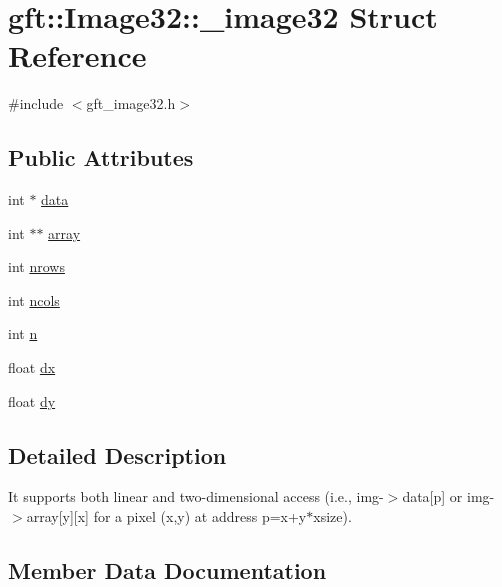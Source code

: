 \hypertarget{structgft_1_1Image32_1_1__image32}{}\section{gft\+:\+:Image32\+:\+:\+\_\+image32 Struct Reference}
\label{structgft_1_1Image32_1_1__image32}


{\ttfamily \#include $<$gft\+\_\+image32.\+h$>$}

\subsection*{Public Attributes}
\begin{DoxyCompactItemize}
\item 
int $\ast$ \hyperlink{structgft_1_1Image32_1_1__image32_ab054124c321db9d0fd1f4aa353d0fd46}{data}
\item 
int $\ast$$\ast$ \hyperlink{structgft_1_1Image32_1_1__image32_a2a657a1032f09c6f75c9fcab33959cf9}{array}
\item 
int \hyperlink{structgft_1_1Image32_1_1__image32_aa912fd17d6133ee3d1fcf668865e4677}{nrows}
\item 
int \hyperlink{structgft_1_1Image32_1_1__image32_a6435c546474bb74eb8476b5683815b84}{ncols}
\item 
int \hyperlink{structgft_1_1Image32_1_1__image32_a3961d7deb5c522b9c1db5f08c8fe732c}{n}
\item 
float \hyperlink{structgft_1_1Image32_1_1__image32_a361e6d86f1cc6efcc8961d4e46fc51c8}{dx}
\item 
float \hyperlink{structgft_1_1Image32_1_1__image32_a6243d3d012d94c8c39ddddd6e21b592f}{dy}
\end{DoxyCompactItemize}


\subsection{Detailed Description}
It supports both linear and two-\/dimensional access (i.\+e., img-\/$>$data\mbox{[}p\mbox{]} or img-\/$>$array\mbox{[}y\mbox{]}\mbox{[}x\mbox{]} for a pixel (x,y) at address p=x+y$\ast$xsize). 

\subsection{Member Data Documentation}
